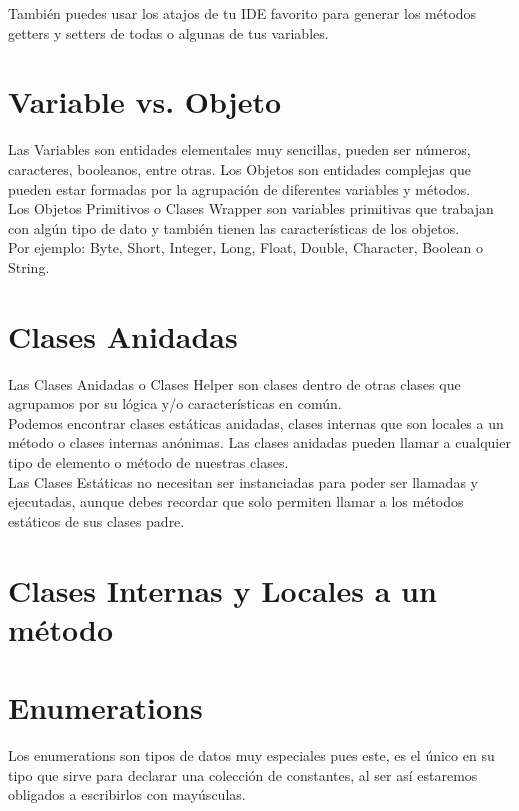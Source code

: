 \documentclass{article}
\begin{document}
También puedes usar los atajos de tu IDE favorito para generar los métodos
getters y setters de todas o algunas de tus variables.\\


\section{Variable vs. Objeto}%
Las Variables son entidades elementales muy sencillas, pueden ser números,
caracteres, booleanos, entre otras. Los Objetos son entidades complejas que
pueden estar formadas por la agrupación de diferentes variables y métodos.\\

Los Objetos Primitivos o Clases Wrapper son variables primitivas que trabajan
con algún tipo de dato y también tienen las características de los objetos.\\

Por ejemplo: Byte, Short, Integer, Long, Float, Double, Character, Boolean o
String.\\


\section{Clases Anidadas}%
Las Clases Anidadas o Clases Helper son clases dentro de otras clases que
agrupamos por su lógica y/o características en común.\\

Podemos encontrar clases estáticas anidadas, clases internas que son locales a
un método o clases internas anónimas. Las clases anidadas pueden llamar a
cualquier tipo de elemento o método de nuestras clases.\\

Las Clases Estáticas no necesitan ser instanciadas para poder ser llamadas y
ejecutadas, aunque debes recordar que solo permiten llamar a los métodos
estáticos de sus clases padre.\\


\section{Clases Internas y Locales a un método}%


\section{Enumerations}%
Los enumerations son tipos de datos muy especiales pues este, es el único en su
tipo que sirve para declarar una colección de constantes, al ser así estaremos
obligados a escribirlos con mayúsculas.\\
\end{document}
